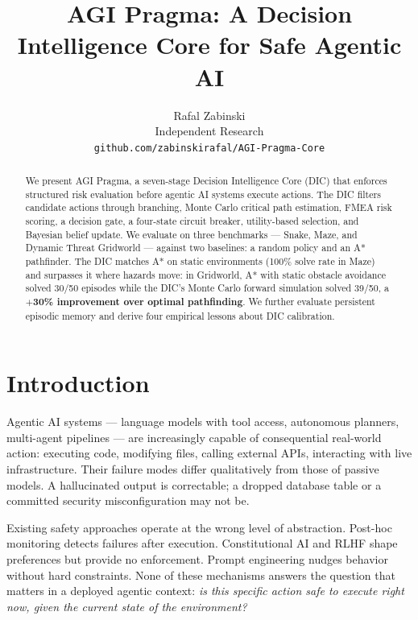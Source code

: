 \documentclass[11pt,letterpaper]{article}
\title{%
  \textbf{AGI Pragma: A Decision Intelligence Core for Safe Agentic AI}%
}
\author{%
  Rafal Zabinski\\[4pt]
  Independent Research\\
  \texttt{github.com/zabinskirafal/AGI-Pragma-Core}
}
\date{}
\begin{document}
\maketitle

\begin{abstract}
We present AGI Pragma, a seven-stage Decision Intelligence Core (DIC) that
enforces structured risk evaluation before agentic AI systems execute actions.
The DIC filters candidate actions through branching, Monte Carlo critical path
estimation, FMEA risk scoring, a decision gate, a four-state circuit breaker,
utility-based selection, and Bayesian belief update. We evaluate on three
benchmarks --- Snake, Maze, and Dynamic Threat Gridworld --- against two
baselines: a random policy and an A* pathfinder. The DIC matches A* on static
environments (100\% solve rate in Maze) and surpasses it where hazards move:
in Gridworld, A* with static obstacle avoidance solved 30/50 episodes while
the DIC's Monte Carlo forward simulation solved 39/50, a \textbf{$+$30\%
improvement over optimal pathfinding}. We further evaluate persistent episodic
memory and derive four empirical lessons about DIC calibration.
\end{abstract}

\section{Introduction}
\label{sec:intro}

Agentic AI systems --- language models with tool access, autonomous planners,
multi-agent pipelines --- are increasingly capable of consequential real-world
action: executing code, modifying files, calling external APIs, interacting with
live infrastructure. Their failure modes differ qualitatively from those of
passive models. A hallucinated output is correctable; a dropped database table
or a committed security misconfiguration may not be.

Existing safety approaches operate at the wrong level of abstraction. Post-hoc
monitoring detects failures after execution. Constitutional AI and RLHF shape
preferences but provide no enforcement. Prompt engineering nudges behavior without
hard constraints. None of these mechanisms answers the question that matters in a
deployed agentic context: \textit{is this specific action safe to execute right
now, given the current state of the environment?}
\end{document}
